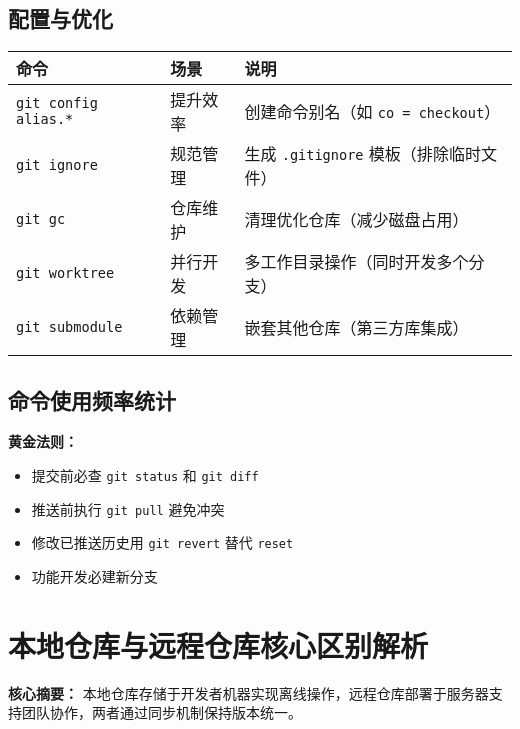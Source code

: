\subsection{配置与优化}
\begin{center}
\begin{tabular}{llp{8cm}}
    \toprule
    \textbf{命令} & \textbf{场景} & \textbf{说明} \\
    \midrule
    \texttt{git config alias.*} & 提升效率 & 创建命令别名（如 \texttt{co = checkout}） \\
    \texttt{git ignore} & 规范管理 & 生成 \texttt{.gitignore} 模板（排除临时文件） \\
    \texttt{git gc} & 仓库维护 & 清理优化仓库（减少磁盘占用） \\
    \texttt{git worktree} & 并行开发 & 多工作目录操作（同时开发多个分支） \\
    \texttt{git submodule} & 依赖管理 & 嵌套其他仓库（第三方库集成） \\
    \bottomrule
\end{tabular}
\end{center}

\subsection{命令使用频率统计}
\begin{center}
\end{center}

\textbf{黄金法则：}
\begin{itemize}[leftmargin=*, nosep]
    \item 提交前必查 \texttt{git status} 和 \texttt{git diff}
    \item 推送前执行 \texttt{git pull} 避免冲突
    \item 修改已推送历史用 \texttt{git revert} 替代 \texttt{reset}
    \item 功能开发必建新分支
\end{itemize}


\section{本地仓库与远程仓库核心区别解析}
\textbf{核心摘要：}  
本地仓库存储于开发者机器实现离线操作，远程仓库部署于服务器支持团队协作，两者通过同步机制保持版本统一。

